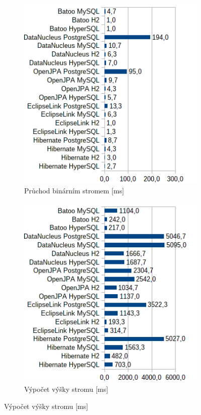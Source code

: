 \begin{figure}\ContinuedFloat
  \begin{subfigure}[b]{1\textwidth}
  \includegraphics[width=25em]{obr/bench/jpa11}
  \caption{Průchod binárním stromem [ms]}\label{img:jpa11}
  \end{subfigure}
  \begin{subfigure}[b]{1\textwidth}
  \includegraphics[width=25em]{obr/bench/jpa12}
  \caption{Výpočet výšky stromu [ms]}\label{img:jpa12}
  \end{subfigure}
\end{figure}

